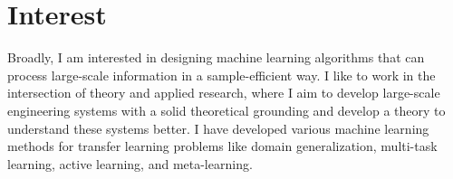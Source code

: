 \section{\mysidestyle \textcolor{olgray}{Interest}}
Broadly, I am interested in designing machine learning algorithms that can process large-scale information in a sample-efficient way.  
I like to work in the intersection of theory and applied research, where I aim to develop large-scale engineering systems with a solid theoretical grounding and develop a theory to understand these systems better. I have developed various machine learning methods for transfer learning problems like domain generalization, multi-task learning, active learning, and meta-learning.